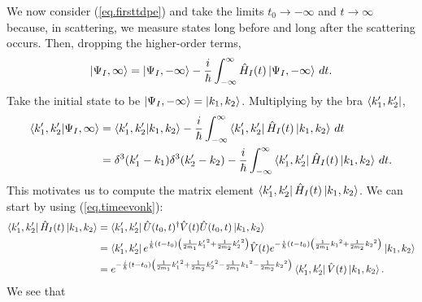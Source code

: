 We now consider (\ref{eq.firsttdpe}) and take the limits \(t_0 \to -\infty\) and \(t \to \infty\) because, in scattering, we measure states long before and long after the scattering occurs. Then, dropping the higher-order terms,
\[
\left|\Psi_I, \infty\right\rangle = \left|\Psi_I, -\infty\right\rangle - \frac{i}{\hbar} \int_{-\infty}^\infty \hat{H}_I(t)\left|\Psi_I, -\infty\right\rangle \,dt.
\]
Take the initial state to be \(\left|\Psi_I, -\infty\right\rangle = \left|k_1, k_2\right\rangle\). Multiplying by the bra \(\left\langle k_1^\prime, k_2^\prime\right|\),
\begin{align}
\left\langle k_1^\prime, k_2^\prime|\Psi_I, \infty\right\rangle &= \left\langle k_1^\prime, k_2^\prime|k_1, k_2\right\rangle - \frac{i}{\hbar} \int_{-\infty}^\infty \left\langle k_1^\prime, k_2^\prime\right| \hat{H}_I(t)\left|k_1, k_2\right\rangle \,dt \nonumber\\
&= \delta^3(k_1^\prime - k_1)\delta^3(k_2^\prime - k_2) - \frac{i}{\hbar} \int_{-\infty}^\infty \left\langle k_1^\prime, k_2^\prime\right| \hat{H}_I(t)\left|k_1, k_2\right\rangle \,dt. \label{eq.intermed}
\end{align}
This motivates us to compute the matrix element \(\left\langle k_1^\prime, k_2^\prime\right| \hat{H}_I(t)\left|k_1, k_2\right\rangle\). We can start by using (\ref{eq.timeevonk}):
\begin{align*}
\left\langle k_1^\prime, k_2^\prime\right| \hat{H}_I(t)\left|k_1, k_2\right\rangle
&= \left\langle k_1^\prime, k_2^\prime\right| \hat{U}(t_0, t)^\dagger \hat{V}(t) \hat{U}(t_0, t) \left|k_1, k_2\right\rangle \nonumber\\
&= \left\langle k_1^\prime, k_2^\prime\right| e^{\frac{i}{\hbar}\left(t-t_0\right)\left(\frac{1}{2m_1}{k_1^\prime}^2 + \frac{1}{2m_2}{k_2^\prime}^2\right)} \hat{V}(t) e^{-\frac{i}{\hbar}\left(t-t_0\right)\left(\frac{1}{2m_1}{k_1}^2 + \frac{1}{2m_2}{k_2}^2\right)} \left|k_1, k_2\right\rangle \nonumber\\
&= e^{-\frac{i}{\hbar}\left(t-t_0\right)\left(\frac{1}{2m_1}{k_1^\prime}^2 + \frac{1}{2m_2}{k_2^\prime}^2 - \frac{1}{2m_1}{k_1}^2 - \frac{1}{2m_2}{k_2}^2\right)} \left\langle k_1^\prime, k_2^\prime\right| \hat{V}(t) \left|k_1, k_2\right\rangle.
\end{align*}
We see that
